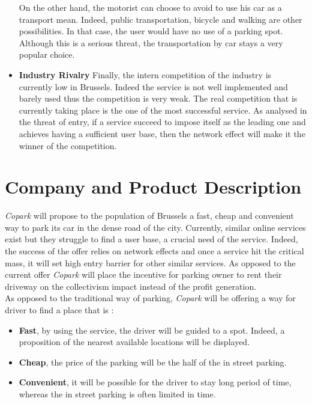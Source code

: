 \documentclass[12pt,a4paper,oneside]{book}
\newcommand{\bp}{\textit{Copark }}
\begin{document}
\begin{itemize}
On the other hand, the motorist can choose to avoid to use his car as a transport mean. Indeed, public transportation, bicycle and walking are other possibilities. In that case, the user would have no use of a parking spot. Although this is a serious threat, the transportation by car stays a very popular choice.
\item \textbf{Industry Rivalry} Finally, the intern competition of the industry is currently low in Brussels. Indeed the service is not well implemented and barely used thus the competition is very weak. The real competition that is currently taking place is the one of the most successful service. As analysed in the threat of entry, if a service succeed to impose itself as the leading one and achieves  having a sufficient user base, then the network effect will make it the winner of the competition.
\end{itemize}

\chapter{Company and Product Description}

\bp will propose to the population of Brussels a fast, cheap and convenient way to park its car in the dense road of the city. Currently, similar online services exist but they struggle to find a user base, a crucial need of the service. Indeed, the success of the offer relies on network effects and once a service hit the critical mass, it will set high entry barrier for other similar services. As opposed to the current offer \bp will place the incentive for parking owner to rent their driveway on the collectivism impact instead of the profit generation.\\

As opposed to the traditional way of parking, \bp will be offering a way for driver to find a place that is :
\begin{itemize}
\item \textbf{Fast}, by using the service, the driver will be guided to a spot. Indeed, a proposition of the nearest available locations will be displayed.
\item \textbf{Cheap}, the price of the parking will be the half of the in street parking.
\item \textbf{Convenient}, it will be possible for the driver to stay long period of time, whereas the in street parking is often limited in time.
\end{itemize} 
\end{document}
